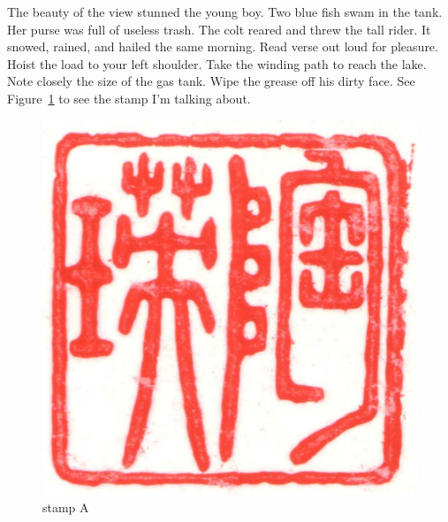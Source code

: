 \documentclass[
  letterpaper,
  DIV=11,
  numbers=noendperiod]{scrartcl}
\begin{document}
The beauty of the view stunned the young boy. Two blue fish swam in the
tank. Her purse was full of useless trash. The colt reared and threw the
tall rider. It snowed, rained, and hailed the same morning. Read verse
out loud for pleasure. Hoist the load to your left shoulder. Take the
winding path to reach the lake. Note closely the size of the gas tank.
Wipe the grease off his dirty face. See Figure~\ref{fig-stamp1a} to see
the stamp I'm talking about.

\begin{figure}

{\centering \includegraphics{stamp1a.jpg}

}

\caption{\label{fig-stamp1a}stamp A}

\end{figure}
\end{document}
